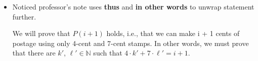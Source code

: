 \documentclass[12pt]{article}
\begin{document}
\begin{itemize}
\begin{itemize}
        \item Noticed professor's note uses \textbf{thus} and \textbf{in other words} to
        unwrap statement further.

        \begin{mdframed}
        We will prove that $P(i + 1)$ holds, i.e., that we can make i + 1 cents
        of postage using only 4-cent and 7-cent stamps. In other words,
        we must prove that there are $k'$, $\ell' \in \mathbb{N}$ such that
        $4 \cdot k' + 7 \cdot \ell' = i + 1$.
        \end{mdframed}
    \end{itemize}



















\end{itemize}
\end{document}
